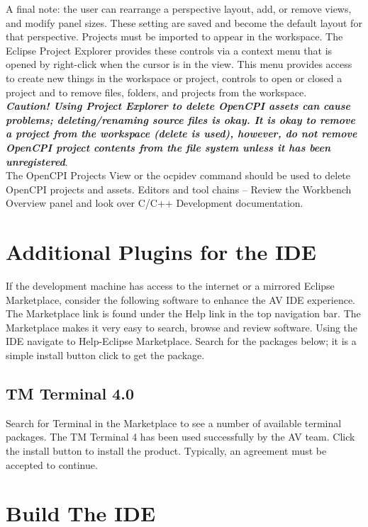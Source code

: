 \documentclass[10pt, a4paper, oneside]{article}
\begin{document}
\begin{appendices}
A final note: the user can rearrange a perspective layout, add, or remove views, and modify panel sizes. These setting are saved and become the default layout for that perspective. Projects must be imported to appear in the workspace. The Eclipse Project Explorer provides these controls via a context menu that is opened by right-click when the cursor is in the view. This menu provides access to create new things in the workspace or project, controls to open or closed a project and to remove files, folders, and projects from the workspace.\\

\textbf{\emph{Caution! Using Project Explorer to delete OpenCPI assets can cause problems; deleting/renaming source files is okay. It is okay to remove a project from the workspace (delete is used), however, do not remove OpenCPI project contents from the file system unless it has been unregistered}}. \\

The OpenCPI Projects View or the ocpidev command should be used to delete OpenCPI projects and assets. Editors and tool chains – Review the Workbench Overview panel and look over C/C++ Development documentation.
\newpage
\section{Additional Plugins for the IDE}
If the development machine has access to the internet or a mirrored Eclipse Marketplace, consider the following software to enhance the AV IDE experience. The Marketplace link is found under the Help link in the top navigation bar. The Marketplace makes it very easy to search, browse and review software. Using the IDE navigate to Help-Eclipse Marketplace. Search for the packages below; it is a simple install button click to get the package.\\
\subsection{TM Terminal 4.0}
Search for Terminal in the Marketplace to see a number of available terminal packages. The TM Terminal 4 has been used successfully by the AV team. Click the install button to install the product. Typically, an agreement must be accepted to continue.\\
\newpage
\section{Build The IDE}
\newcommand{\cmd}[1]{\subitem \textbf{cmd:} \code{#1}}

\end{appendices}
\end{document}
